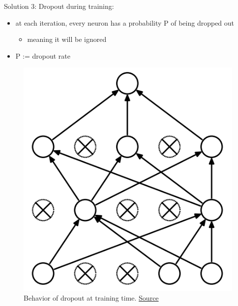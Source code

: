 \begin{frame}{Solution 3: Dropout}
	during training:
	\begin{itemize}
		\item at each iteration, every neuron has a probability P of being dropped out
		\begin{itemize}
			\item meaning it will be ignored
		\end{itemize}
		\item P := dropout rate
	\end{itemize}
	
	\begin{figure}[H]
		\centering
		\includegraphics[height=0.4\textheight]{Figs/Dropout-after.png}
		\caption{Behavior of dropout at training time. \href{https://www.cs.toronto.edu/~hinton/absps/JMLRdropout.pdf}{Source}}
	\end{figure}
\end{frame}

